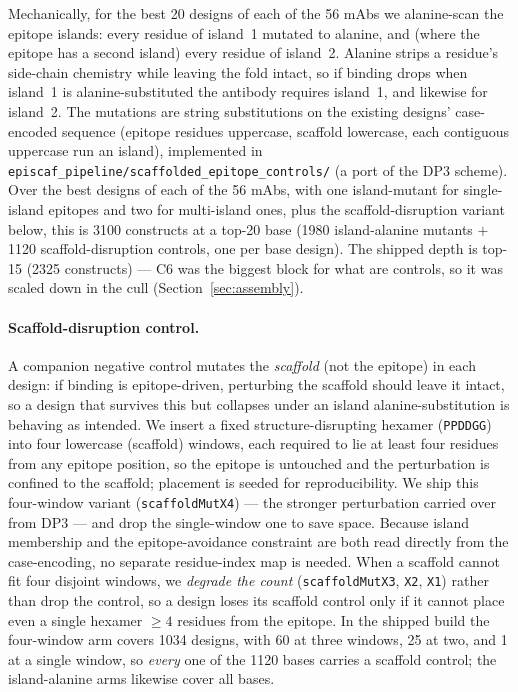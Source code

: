 Mechanically, for the best \num{20} designs of each of the \num{56} mAbs we alanine-scan the epitope
islands: every residue of island~1 mutated to alanine, and (where the epitope has a second island) every
residue of island~2. Alanine strips a residue's side-chain chemistry while leaving the fold intact, so if
binding drops when island~1 is alanine-substituted the antibody requires island~1, and likewise for
island~2. The mutations are string substitutions on the existing designs' case-encoded sequence (epitope
residues uppercase, scaffold lowercase, each contiguous uppercase run an island), implemented in
\texttt{episcaf\_pipeline/scaffolded\_epitope\_controls/} (a port of the DP3 scheme). Over the best
designs of each of the \num{56} mAbs, with one island-mutant for single-island epitopes and two for
multi-island ones, plus the scaffold-disruption variant below, this is \num{3100} constructs at a top-20
base (\num{1980} island-alanine mutants $+$ \num{1120} scaffold-disruption controls, one per base design).
The shipped depth is top-\num{15} (\num{2325} constructs) --- C6 was the biggest block for what are
controls, so it was scaled down in the cull (Section~\ref{sec:assembly}).

\paragraph{Scaffold-disruption control.} A companion negative control mutates the \emph{scaffold}
(not the epitope) in each design: if binding is epitope-driven, perturbing the scaffold should leave
it intact, so a design that survives this but collapses under an island alanine-substitution is
behaving as intended. We insert a fixed structure-disrupting hexamer (\texttt{PPDDGG}) into four
lowercase (scaffold) windows, each required to lie at least four residues from any epitope position,
so the epitope is untouched and the perturbation is confined to the scaffold; placement is seeded for
reproducibility. We ship this four-window variant (\texttt{scaffoldMutX4}) --- the stronger
perturbation carried over from DP3 --- and drop the single-window one to save space. Because island
membership and the epitope-avoidance constraint are both read directly from the case-encoding, no
separate residue-index map is needed. When a scaffold cannot fit four disjoint windows, we
\emph{degrade the count} (\texttt{scaffoldMutX3}, \texttt{X2}, \texttt{X1}) rather than drop the control,
so a design loses its scaffold control only if it cannot place even a single hexamer $\ge\!4$ residues
from the epitope. In the shipped build the four-window arm covers \num{1034} designs, with \num{60} at
three windows, \num{25} at two, and \num{1} at a single window, so \emph{every} one of the \num{1120}
bases carries a scaffold control; the island-alanine arms likewise cover all bases.

